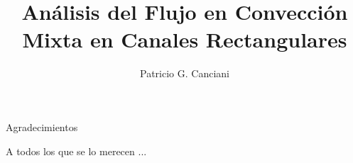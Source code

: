 \documentclass[12pt,screen,twoside]{ibtesis}
\title{Análisis del Flujo en Convección Mixta en Canales Rectangulares}
\author{Patricio G. Canciani}
\begin{document}

\begin{preliminary}



\begin{abreviaturas}
\end{abreviaturas}

\tableofcontents                %




\end{preliminary}









%
\appendix







\begin{postliminary}


\begin{seccion}{Agradecimientos}
 
A todos los que se lo merecen ...
\end{seccion}

\end{postliminary}
\end{document}
